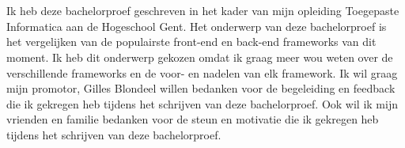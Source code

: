 
\chapter*{}%
\label{ch:voorwoord}


Ik heb deze bachelorproef geschreven in het kader van mijn opleiding Toegepaste Informatica aan de Hogeschool Gent. Het onderwerp van deze bachelorproef is het vergelijken van de populairste front-end en back-end frameworks van dit moment. Ik heb dit onderwerp gekozen omdat ik graag meer wou weten over de verschillende frameworks en de voor- en nadelen van elk framework. Ik wil graag mijn promotor, Gilles Blondeel willen bedanken voor de begeleiding en feedback die ik gekregen heb tijdens het schrijven van deze bachelorproef. Ook wil ik mijn vrienden en familie bedanken voor de steun en motivatie die ik gekregen heb tijdens het schrijven van deze bachelorproef.